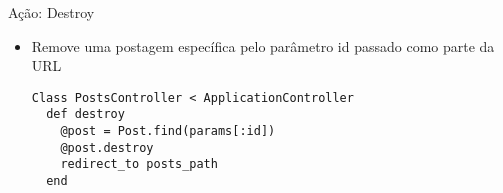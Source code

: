 \begin{frame}{Ação: Destroy}
	\begin{itemize}
		\item Remove uma postagem específica pelo parâmetro \alert{id} passado como parte da URL
		\begin{lstlisting}[style=RubyInputStyle, caption=posts\_controller.rb]
Class PostsController < ApplicationController
  def destroy
    @post = Post.find(params[:id])
	@post.destroy
	redirect_to posts_path
  end 
		\end{lstlisting}		
	\end{itemize}	
\end{frame}